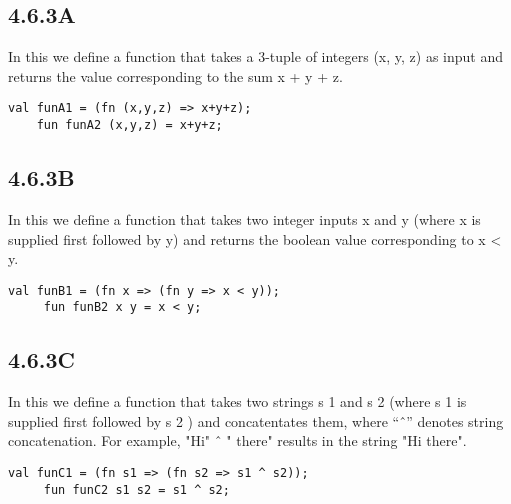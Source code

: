 \documentclass{report}
\begin{document}
 \subsection{4.6.3A}
 \label{sec:4.6.3a}

 In this we define a function that takes a 3-tuple of integers (x, y,
z) as input and returns the value corresponding to the sum x + y + z.


  \lstset{frameround=tttt}
   \begin{lstlisting}[frame=tRBL]
    val funA1 = (fn (x,y,z) => x+y+z);
    fun funA2 (x,y,z) = x+y+z;
   \end{lstlisting}

 
 \subsection{4.6.3B}
 \label{sec:4.6.3b}

 In this we define a function that takes two integer inputs x and y
 (where x is supplied first followed by y) and returns the boolean
 value corresponding to x < y.


   \lstset{frameround=tttt}
    \begin{lstlisting}[frame=tRBL]
     val funB1 = (fn x => (fn y => x < y));
     fun funB2 x y = x < y;
    \end{lstlisting}
 
 
 \subsection{4.6.3C}
 \label{sec:4.6.3c}

 In this we define a function that takes two strings s 1 and s 2 (where s 1 is supplied first followed by s 2 ) and concatentates them, where “ˆ” denotes string concatenation. For example, "Hi" ˆ " there" results in the string "Hi there".



   \lstset{frameround=tttt}
    \begin{lstlisting}[frame=tRBL]
     val funC1 = (fn s1 => (fn s2 => s1 ^ s2));
     fun funC2 s1 s2 = s1 ^ s2;
    \end{lstlisting}

\end{document}

